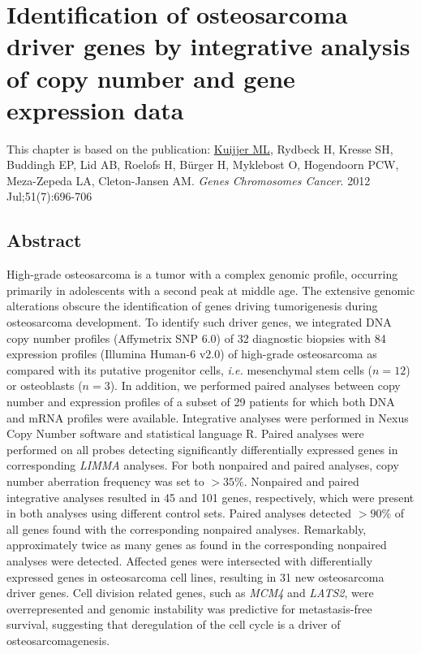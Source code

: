 

%


\chapter{Identification of osteosarcoma driver genes by integrative analysis of copy number and gene expression data}\label{ch7}
\thispagestyle{empty}				%

\vfill

\vspace{0.5cm}
This chapter is based on the publication:
\underline{Kuijjer ML}, Rydbeck H, Kresse SH, Buddingh EP, Lid AB, Roelofs H, B{\"u}rger H, Myklebost O, Hogendoorn PCW, Meza-Zepeda LA, Cleton-Jansen AM. {\it Genes Chromosomes Cancer}. 2012 Jul;51(7):696-706

\newpage


\section{Abstract}\label{abstract7}
High-grade osteosarcoma is a tumor with a complex genomic profile, occurring primarily in adolescents with a second peak
at middle age. The extensive genomic alterations obscure the identification of genes driving tumorigenesis during osteosarcoma
development. To identify such driver genes, we integrated DNA copy number profiles (Affymetrix SNP 6.0) of 32 diagnostic
biopsies with 84 expression profiles (Illumina Human-6 v2.0) of high\hyp{}grade osteosarcoma as compared with its
putative progenitor cells, {\it i.e.} mesenchymal stem cells ($n=12$) or osteoblasts ($n=3$). In addition, we performed paired analyses between copy number and expression profiles of a subset of 29 patients for which both DNA and mRNA profiles were available. Integrative analyses were performed in Nexus Copy Number software and statistical language R. Paired analyses
were performed on all probes detecting significantly differentially expressed genes in corresponding {\it LIMMA} analyses. For
both nonpaired and paired analyses, copy number aberration frequency was set to $>35\%$. Nonpaired and paired integrative
analyses resulted in 45 and 101 genes, respectively, which were present in both analyses using different control sets. Paired
analyses detected $>90\%$ of all genes found with the corresponding nonpaired analyses. Remarkably, approximately twice as
many genes as found in the corresponding nonpaired analyses were detected. Affected genes were intersected with differentially expressed genes in osteosarcoma cell lines, resulting in 31 new osteosarcoma driver genes. Cell division related genes, such as {\it MCM4} and {\it LATS2}, were overrepresented and genomic instability was predictive for metastasis\hyp{}free survival, suggesting that deregulation of the cell cycle is a driver of osteosarcomagenesis.


